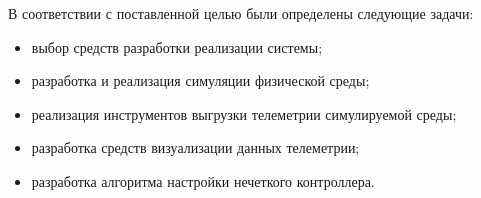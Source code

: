 В соответствии с поставленной целью были определены следующие задачи:

\begin{itemize}
  \item выбор средств разработки реализации системы;
  \item разработка и реализация симуляции физической среды;
  \item реализация инструментов выгрузки телеметрии симулируемой среды;
  \item разработка средств визуализации данных телеметрии;
  \item разработка алгоритма настройки нечеткого контроллера.
\end{itemize}